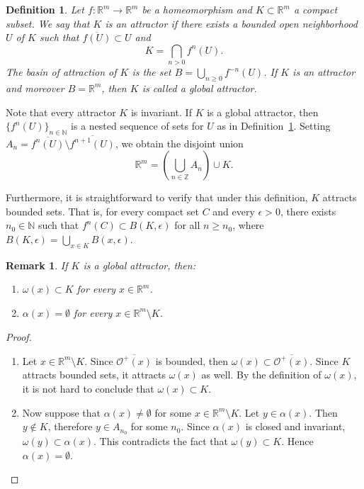 \documentclass{amsart}
\newtheorem{rmk}{Remark}
\newtheorem{dfn}{Definition}
\newcommand{\R}{{\mathbb{R}}}
\newcommand{\Z}{{\mathbb{Z}}}
\newcommand{\N}{{\mathbb{N}}}
\begin{document}
	\begin{dfn}\label{def_atractor} 
		Let $f:\R^m\to \R^m$ be a homeomorphism and $K\subset \R^m$ a compact subset.
		We say that $K$ is an \emph{ attractor} if there exists a bounded open neighborhood $U$ of $K$ such that $\overline{f(U)}\subset U$ and
		\[
		K=\bigcap_{n>0} f^n(U).
		\]
		The \emph{basin of attraction} of $K$ is the set $B=\bigcup_{n\geq0} f^{-n}(U)$.  
		If $K$ is an attractor and moreover $B=\R^m$, then $K$ is called a \emph{ global attractor}.
	\end{dfn}
	
	Note that every  attractor $K$ is invariant. If $K$ is a  global attractor, then  $\{f^n(U)\}_{n\in\N}$ is a nested sequence of sets for  $U$ as in Definition~\ref{def_atractor}. Setting $A_n=\overline{f^n(U)}\setminus \overline{f^{n+1}(U)}$, we obtain the disjoint union
	\[
	\R^m=\left(\bigcup_{n\in \Z} A_n\right)\cup K.
	\]
	
	Furthermore, it is straightforward to verify that under this definition,  $K$ attracts bounded sets. That is,  for every compact set $C$  and every  $\epsilon>0$, there exists $n_0\in \N$ such that $f^{n}(C)\subset B(K,\epsilon)$ for all $n\geq n_0$, where $B(K, \epsilon)=\bigcup_{x\in K} B(x,\epsilon)$. %
	
	\begin{rmk}\label{K_sin_agujeros}
		If $K$ is a  global attractor, then: 
	\begin{enumerate} \item $\omega(x)\subset K$ for every $x\in \R^m$.
		 \item $\alpha(x)=\emptyset$ for every $x\in \R^m\setminus K$.
	\end{enumerate}	 
	\end{rmk} 
	
	\begin{proof}$\,$ 
		
		
	\begin{enumerate}
\item		Let $x\in \R^m\setminus K$. Since $\overline{\mathcal{O}^+(x)}$ is bounded, then  $\omega(x)\subset \overline{\mathcal{O}^+(x)}$. Since  $K$ attracts bounded sets, it attracts $\omega(x)$ as well. By the definition of $\omega(x)$, it is not hard to conclude that $\omega(x)\subset K$.  
		
	\item 	Now suppose that $\alpha(x)\neq \emptyset$ for some $x\in \R^m\setminus K$. Let $y\in\alpha(x)$. Then $y\notin K$, therefore $y\in A_{n_0}$ for some $n_0$. Since $\alpha(x)$ is closed and invariant, $\omega(y)\subset\alpha(x)$. This contradicts the fact that $\omega(y)\subset K$. Hence $\alpha(x)=\emptyset$.
	\end{enumerate}
	\end{proof}
	
\end{document}

